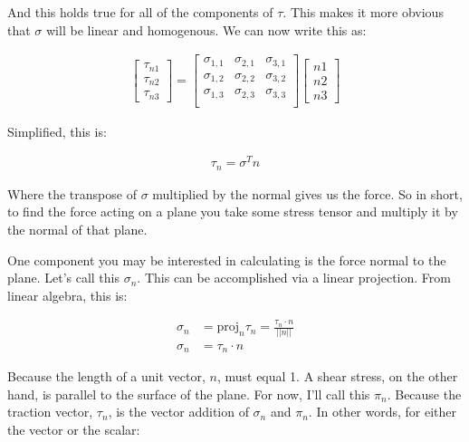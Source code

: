 And this holds true for all of the components of $\tau$. This makes it more obvious that $\sigma$ will be linear and homogenous. We can now write this as: 

\begin{align}
\begin{bmatrix} %
\tau_{n1} \\
\tau_{n2} \\
\tau_{n3}
\end{bmatrix}
=
\begin{bmatrix} %
\sigma_{1,1} & \sigma_{2,1} & \sigma_{3,1} \\
\sigma_{1,2} & \sigma_{2,2} & \sigma_{3,2} \\
\sigma_{1,3} & \sigma_{2,3} & \sigma_{3,3} \\
\end{bmatrix}
\begin{bmatrix} %
n1 \\
n2 \\
n3
\end{bmatrix}
\end{align}

Simplified, this is: 

\begin{equation} \label{phenom1}
\begin{split}
\tau_n = \sigma^Tn
\end{split}
\end{equation}

Where the transpose of $\sigma$ multiplied by the normal gives us the force. So in short, to find the force acting on a plane you take some stress tensor and multiply it by the normal of that plane.\newline



One component you may be interested in calculating is the force normal to the plane. Let's call this $\sigma_n$. This can be accomplished via a linear projection. From linear algebra, this is: 


\begin{equation} \label{phenom1}
\begin{split}
\sigma_n &= \mathrm{proj}_n\tau_n = \frac{\tau_n \cdot n}{||n||}\\
\sigma_n &= \tau_n \cdot n
\end{split}
\end{equation}

Because the length of a unit vector, $n$, must equal 1. A shear stress, on the other hand, is parallel to the surface of the plane. For now, I'll call this $\pi_n$. Because the traction vector, $\tau_n$, is the vector addition of $\sigma_n$ and $\pi_n$. In other words, for either the vector or the scalar: 

